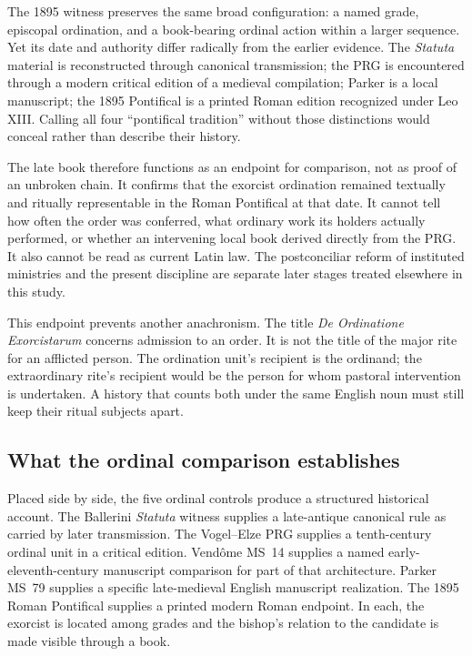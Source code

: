The 1895 witness preserves the same broad configuration: a named grade,
episcopal ordination, and a book-bearing ordinal action within a larger
sequence. Yet its date and authority differ radically from the earlier
evidence. The \emph{Statuta} material is reconstructed through canonical
transmission; the PRG is encountered through a modern critical edition of a
medieval compilation; Parker is a local manuscript; the 1895 Pontifical is a
printed Roman edition recognized under Leo XIII. Calling all four
``pontifical tradition'' without those distinctions would conceal rather than
describe their history.

The late book therefore functions as an endpoint for comparison, not as proof
of an unbroken chain. It confirms that the exorcist ordination remained
textually and ritually representable in the Roman Pontifical at that date.
It cannot tell how often the order was conferred, what ordinary work its
holders actually performed, or whether an intervening local book derived
directly from the PRG. It also cannot be read as current Latin law. The
postconciliar reform of instituted ministries and the present discipline are
separate later stages treated elsewhere in this study.

This endpoint prevents another anachronism. The title
\emph{De Ordinatione Exorcistarum} concerns admission to an order. It is not
the title of the major rite for an afflicted person. The ordination unit's
recipient is the ordinand; the extraordinary rite's recipient would be the
person for whom pastoral intervention is undertaken. A history that counts
both under the same English noun must still keep their ritual subjects apart.

\subsection{What the ordinal comparison establishes}

Placed side by side, the five ordinal controls produce a structured historical
account. The Ballerini \emph{Statuta} witness supplies a late-antique canonical
rule as carried by later transmission. The Vogel--Elze PRG supplies a
tenth-century ordinal unit in a critical edition. Vendôme MS~14 supplies a
named early-eleventh-century manuscript comparison for part of that
architecture. Parker MS~79
supplies a specific late-medieval English manuscript realization. The 1895
Roman Pontifical supplies a printed modern Roman endpoint. In each, the
exorcist is located among grades and the bishop's relation to the candidate is
made visible through a book.

